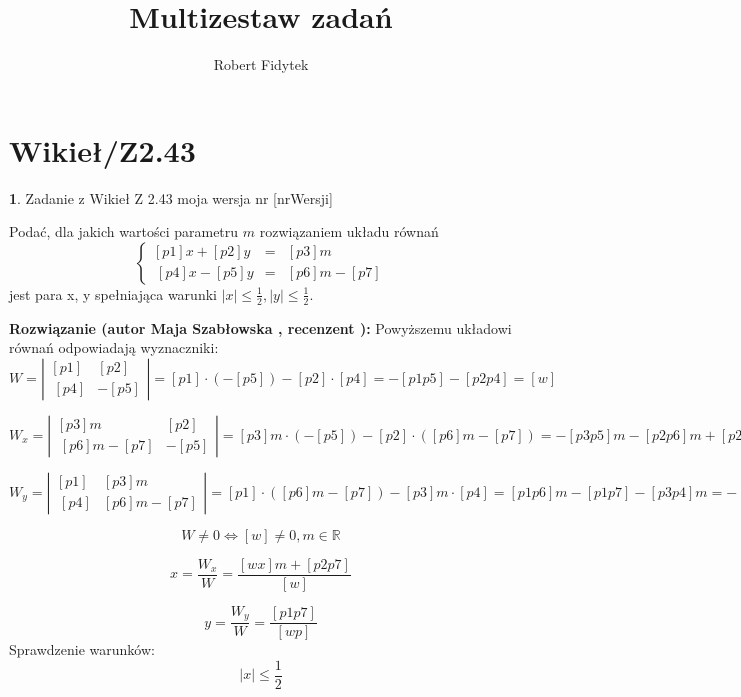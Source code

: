 \documentclass[12pt, a4paper]{article}
\title{Multizestaw zadań}
\author{Robert Fidytek}
\date{}
\theoremstyle{definition} %
\newtheorem{zad}{}
\newcommand{\kategoria}[1]{\section{#1}} %
\newcommand{\zadStart}[1]{\begin{zad}#1\newline} %
\newcommand{\zadStop}{\end{zad}}   %
\newcommand{\rozwStart}[2]{\noindent \textbf{Rozwiązanie (autor #1 , recenzent #2): }\newline} %
\begin{document}
\maketitle


\kategoria{Wikieł/Z2.43}
\zadStart{Zadanie z Wikieł Z 2.43  moja wersja nr [nrWersji]}

Podać, dla jakich wartości parametru $m$ rozwiązaniem układu równań
$$\left\{\begin{array}{ccc}
[p1]x+[p2]y&=&[p3]m\\
\ [p4]x-[p5]y&=&[p6]m-[p7]
\end{array} \right.$$
jest para x, y spełniająca warunki $|x|\leq\frac{1}{2}, |y|\leq\frac{1}{2}.$
\zadStop

\rozwStart{Maja Szabłowska}{}
Powyższemu układowi równań odpowiadają wyznaczniki:
$$W=\left| \begin{array}{lccr} [p1] & [p2] \\ \ [p4] & -[p5] \end{array}\right| = [p1]\cdot(-[p5]) - [p2]\cdot[p4]=-[p1p5]-[p2p4]=[w]$$

$$W_{x}=\left| \begin{array}{lccr} [p3]m & [p2] \\ \ [p6]m-[p7] & -[p5] \end{array}\right| = [p3]m\cdot(-[p5]) - [p2]\cdot([p6]m-[p7])=-[p3p5]m-[p2p6]m+[p2p7]=[wx]m+[p2p7]$$

$$W_{y}=\left| \begin{array}{lccr} [p1] & [p3]m \\ \ [p4] & [p6]m-[p7] \end{array}\right| = [p1]\cdot([p6]m-[p7]) - [p3]m\cdot[p4]=[p1p6]m-[p1p7]-[p3p4]m=-[p1p7]$$

$$W\neq 0 \iff [w] \neq 0, m\in\mathbb{R} $$

$$x=\frac{W_{x}}{W}=\frac{[wx]m+[p2p7]}{[w]}$$

$$y=\frac{W_{y}}{W}=\frac{[p1p7]}{[wp]}$$
Sprawdzenie warunków:
$$|x|\leq\frac{1}{2}$$
\end{document}
